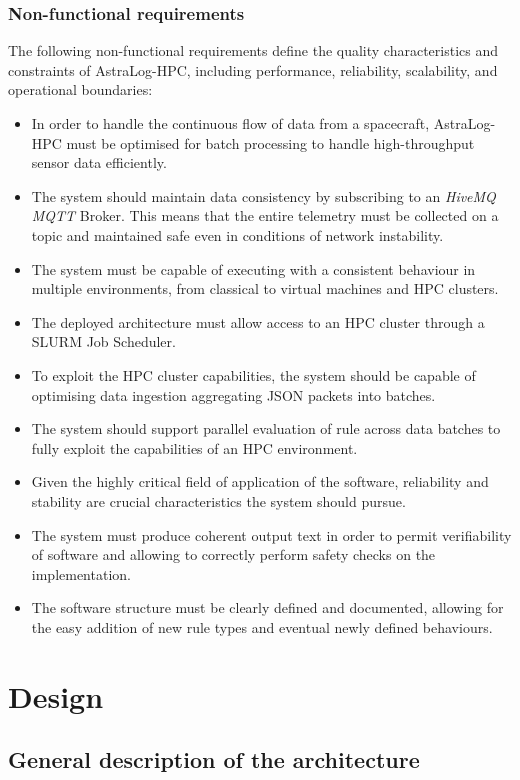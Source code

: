 \documentclass{article}
\begin{document}
\subsubsection{Non-functional requirements}
The following non-functional requirements define the quality characteristics and constraints of AstraLog-HPC, including performance, reliability, scalability, and operational boundaries:
\begin{itemize}
    \item In order to handle the continuous flow of data from a spacecraft, AstraLog-HPC must be optimised for batch processing to handle high-throughput sensor data efficiently. 
    \item The system should maintain data consistency by subscribing to an \textit{HiveMQ MQTT} Broker. This means that the entire telemetry must be collected on a topic and maintained safe even in conditions of network instability.
    \item The system must be capable of executing with a consistent behaviour in multiple environments, from classical to virtual machines and HPC clusters.
    \item The deployed architecture must allow access to an HPC cluster through a SLURM Job Scheduler.
    \item To exploit the HPC cluster capabilities, the system should be capable of optimising data ingestion aggregating JSON packets into batches.
    \item The system should support parallel evaluation of rule across data batches to fully exploit the capabilities of an HPC environment.
    \item Given the highly critical field of application of the software, reliability and stability are crucial characteristics the system should pursue.
    \item The system must produce coherent output text in order to permit verifiability of software and allowing to correctly perform safety checks on the implementation.
    \item The software structure must be clearly defined and documented, allowing for the easy addition of new rule types and eventual newly defined behaviours.
\end{itemize}

\clearpage
\section{Design}
\subsection{General description of the architecture}
\end{document}
